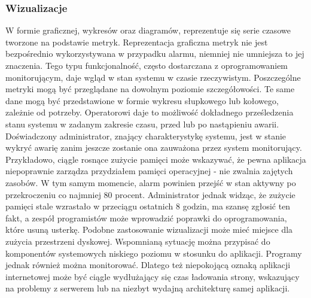         \subsubsection{Wizualizacje}
        W formie graficznej, wykresów oraz diagramów, reprezentuje się serie czasowe tworzone na podstawie metryk. 
        Reprezentacja graficzna metryk nie jest bezpośrednio wykorzystywana w przypadku alarmu,
        niemniej nie umniejsza to jej znaczenia. Tego typu funkcjonalność, często dostarczana z oprogramowaniem
        monitorującym, daje wgląd w stan systemu w czasie rzeczywistym. Poszczególne metryki mogą być
        przeglądane na dowolnym poziomie szczegółowości. Te same dane mogą być przedstawione w formie
        wykresu słupkowego lub kołowego, zależnie od potrzeby. Operatorowi daje
        to możliwość dokładnego prześledzenia stanu systemu w zadanym zakresie czasu, przed lub po
        nastąpieniu awarii. Doświadczony administrator, znający charakterystykę systemu, jest w stanie
        wykryć awarię zanim jeszcze zostanie ona zauważona przez system monitorujący. Przykładowo, ciągle
        rosnące zużycie pamięci może wskazywać, że pewna aplikacja niepoprawnie zarządza przydziałem
        pamięci operacyjnej - nie zwalnia zajętych zasobów. W tym samym momencie, alarm powinien przejść
        w stan aktywny po przekroczeniu co najmniej 80 procent. Administrator jednak widząc, że zużycie pamięci
        stale wzrastało w przeciągu ostatnich 8 godzin, ma szansę zgłosić ten fakt, a zespół programistów
        może wprowadzić poprawki do oprogramowania, które usuną usterkę. Podobne zastosowanie wizualizacji może mieć miejsce dla zużycia przestrzeni dyskowej. Wspomnianą sytuację można przypisać do komponentów
        systemowych niskiego poziomu w stosunku do aplikacji. Programy jednak również można monitorować.
        Dlatego też niepokojącą oznaką aplikacji internetowej może być ciągle wydłużający się czas 
        ładowania strony, wskazujący na problemy z serwerem lub na niezbyt wydajną architekturę samej aplikacji. 